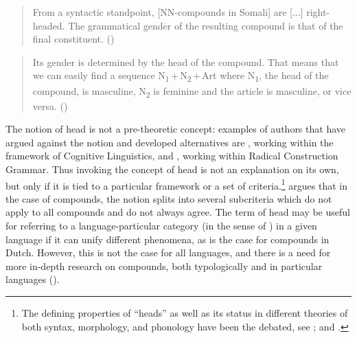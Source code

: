 \documentclass[output=paper]{langscibook}
\begin{document}
\begin{quotation}
    From a syntactic standpoint, {[NN-compounds in Somali]} are {[...]} right-headed. The grammatical gender of the resulting compound is that of the final constituent. (\citealt[15]{Green2016})
\end{quotation}
\begin{quotation}
    Its gender is determined by the head of the compound. That means that we can easily find a sequence N\textsubscript{1}\,+\,N\textsubscript{2}\,+\,Art where N\textsubscript{1}, the head of the compound, is masculine, N\textsubscript{2} is feminine and the article is masculine, or vice versa. (\citealt[7]{Puglielli1989})
\end{quotation}
The notion of head is not a pre-theoretic concept: examples of authors that have argued against the notion and developed alternatives are \textcite{Langacker1987}, working within the framework of Cognitive Linguistics, and \textcite{Croft2001a}, working within Radical Construction Grammar. Thus invoking the concept of head is not an explanation on its own, but only if it is tied to a particular framework or a set of criteria.\footnote{The defining properties of ``heads'' as well as its status in different theories of both syntax, morphology, and phonology have been the debated, see \@ \textcite{Corbett1993,Zwicky1985,Hudson1987}; and \textcite{Moskal2019}.} \textcite[40]{Bauer2017} argues that in the case of compounds, the notion splits into several subcriteria which do not apply to all compounds and do not always agree. The term of head may be useful for referring to a language-particular category (in the sense of \citealt{Haspelmath2018}) in a given language if it can unify different phenomena, as is the case for compounds in Dutch. However, this is not the case for all languages, and there is a need for more in-depth research on compounds, both typologically and in particular languages (\citealt{Scalise2010,Guevara2009}). 
\end{document}
